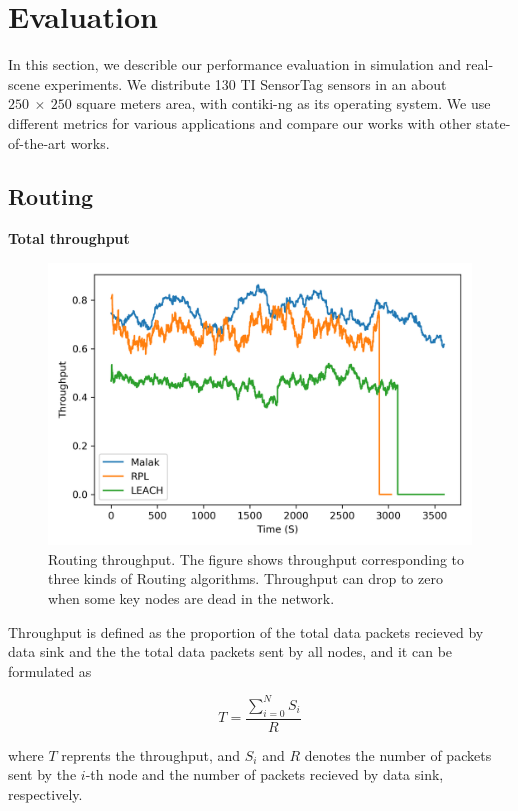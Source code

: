 \section{Evaluation}
\label{Eva}

In this section, we describle our performance evaluation in simulation and
real-scene experiments. We distribute 130 TI SensorTag sensors in an about
$250~\times~250$ square meters area, with contiki-ng as its operating system. We
use different metrics for various applications and compare our works with other
state-of-the-art works.

\subsection{Routing}
\textbf{Total throughput}

\begin{figure}[htbp]
	\centering
	\includegraphics[width=.85\columnwidth]{Figure/throughput}
	\vspace{-0.1in}
	\caption{Routing throughput.
		\textnormal{
			The figure shows throughput corresponding to three kinds of Routing
			algorithms. Throughput can drop to zero when some key nodes are dead
			in the network.
		}}
	\label{fig:throughput}
\end{figure}

Throughput is defined as the proportion of the total data packets recieved by
data sink and the the total data packets sent by all nodes, and it can be
formulated as

\begin{equation}
	T = \frac{\sum_{i = 0}^{N}S_i}{R}
\end{equation}

where $T$ reprents the throughput, and $S_i$ and $R$ denotes the number of
packets sent by the $i$-th node and the number of packets recieved by data
sink, respectively.


